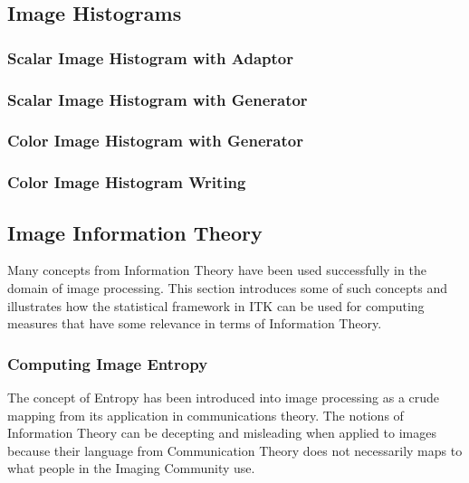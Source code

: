 \subsection{Image Histograms}
\label{sec:ImageHistogram}


\subsubsection{Scalar Image Histogram with Adaptor}
\label{sec:ScalarImageHistogramAdaptor}
\ifitkFullVersion 

\fi


\subsubsection{Scalar Image Histogram with Generator}
\label{sec:ScalarImageHistogramGenerator}
\ifitkFullVersion 

\fi


\subsubsection{Color Image Histogram with Generator}
\label{sec:ColorImageHistogramGenerator}
\ifitkFullVersion 

\fi


\subsubsection{Color Image Histogram Writing}
\label{sec:ColorImageHistogramGeneratorWriting}
\ifitkFullVersion 

\fi


\subsection{Image Information Theory}
\label{sec:ComputingImageEntropy}

Many concepts from Information Theory have been used successfully in the domain
of image processing. This section introduces some of such concepts and
illustrates how the statistical framework in ITK can be used for computing
measures that have some relevance in terms of Information Theory.


\subsubsection{Computing Image Entropy}
\label{sec:ComputingImageEntropy}

The concept of Entropy has been introduced into image processing as a crude
mapping from its application in communications theory. The notions of
Information Theory can be decepting and misleading when applied to images
because their language from Communication Theory does not necessarily maps to
what people in the Imaging Community use.

